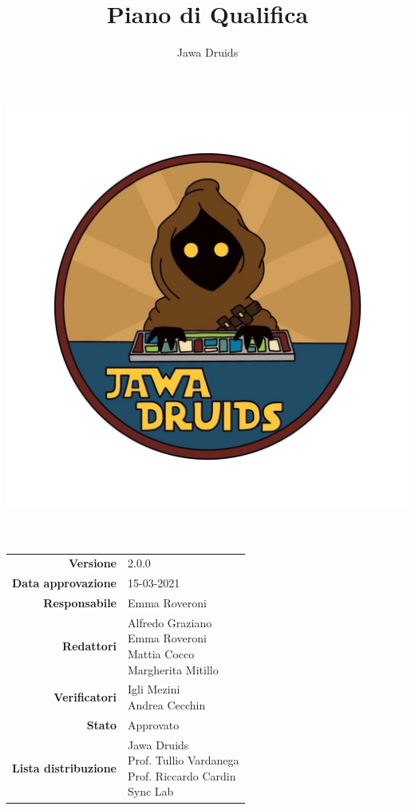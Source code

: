 



	
	\makeatletter
	\begin{titlepage}
		\begin{center}
			\vspace*{-4cm}
			\author{Jawa Druids} 
			\title{Piano di Qualifica}
			\date{} %
			\includegraphics[width=0.5\linewidth]{../immagini/DRUIDSLOGO.jpg}\\[4ex]
			{\huge \bfseries  \@title }\\[2ex] 
			{\LARGE  \@author}\\[50ex]
			\vspace*{-9cm}
			\begin{table}[H]
				\renewcommand{\arraystretch}{1.4}
				\centering
				\begin{tabular}{r | l}
					\textbf{Versione} & 2.0.0 \\%
					\textbf{Data approvazione} & 15-03-2021\\
					\textbf{Responsabile} & Emma Roveroni\\
					\textbf{Redattori} & \makecell[tl]{Alfredo Graziano \\ Emma Roveroni \\ Mattia Cocco \\ Margherita Mitillo} \\
					\textbf{Verificatori} & \makecell[tl]{Igli Mezini \\ Andrea Cecchin} \\
					\textbf{Stato} & Approvato\\
					\textbf{Lista distribuzione} & \makecell[tl]{Jawa Druids \\ Prof. Tullio Vardanega \\ Prof. Riccardo Cardin \\ Sync Lab}\\

\end{tabular}
\end{table}
\end{center}
\end{titlepage}
